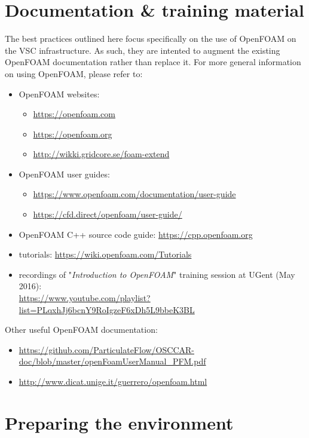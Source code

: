 \section{Documentation \& training material}
\label{sec:best-practices-openfoam-documentation}

The best practices outlined here focus specifically on the use of OpenFOAM on the VSC \hpc infrastructure.
As such, they are intented to augment the existing OpenFOAM documentation rather than replace it.
For more general information on using OpenFOAM, please refer to:
\begin{itemize}
\item OpenFOAM websites:
\begin{itemize}
    \item \url{https://openfoam.com}
    \item \url{https://openfoam.org}
    \item \url{http://wikki.gridcore.se/foam-extend}
\end{itemize}
\item OpenFOAM user guides:
    \begin{itemize}
    \item \url{https://www.openfoam.com/documentation/user-guide}
    \item \url{https://cfd.direct/openfoam/user-guide/}
    \end{itemize}
\item OpenFOAM C++ source code guide: \url{https://cpp.openfoam.org}
\item tutorials: \url{https://wiki.openfoam.com/Tutorials}
\item recordings of "\emph{Introduction to OpenFOAM}" training session at UGent (May 2016):\\
      \small{\url{https://www.youtube.com/playlist?list=PLqxhJj6bcnY9RoIgzeF6xDh5L9bbeK3BL}}
\end{itemize}
Other useful OpenFOAM documentation:
\begin{itemize}
\item {\small\url{https://github.com/ParticulateFlow/OSCCAR-doc/blob/master/openFoamUserManual_PFM.pdf}}
\item \url{http://www.dicat.unige.it/guerrero/openfoam.html}
\end{itemize}

\section{Preparing the environment}
\label{sec:best-practices-openfoam-environment}

